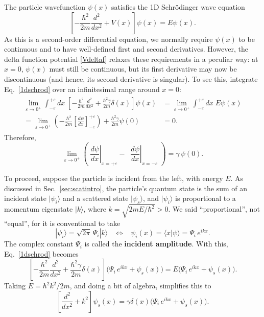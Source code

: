 \documentclass[pra,12pt]{revtex4-2}
\begin{document}
The particle wavefunction $\psi(x)$ satisfies the 1D Schr\"odinger
wave equation
\begin{equation}
  \left[-\frac{\hbar^2}{2m} \frac{d^2}{dx^2} + V(x) \right] \psi(x)
  = E \psi(x).
  \label{1dschrod}
\end{equation}
As this is a second-order differential equation, we normally require
$\psi(x)$ to be continuous and to have well-defined first and second
derivatives.  However, the delta function potential \eqref{Vdeltaf}
relaxes these requirements in a peculiar way: at $x=0$, $\psi(x)$ must
still be continuous, but its first derivative may now be discontinuous
(and hence, its second derivative is singular).  To see this,
integrate Eq.~\eqref{1dschrod} over an infinitesimal range around $x =
0$:
\begin{align}
  \begin{aligned}\lim_{\varepsilon\rightarrow 0^+} \int_{-\varepsilon}^{+\varepsilon} dx\; \left[-\frac{\hbar^2}{2m} \frac{d^2}{dx^2} + \frac{\hbar^2\gamma}{2m} \delta(x)\right] \psi(x) &= \lim_{\varepsilon\rightarrow 0^+} \int_{-\varepsilon}^{+\varepsilon} dx\; E \psi(x) \\ = \lim_{\varepsilon\rightarrow 0^+} \left(-\frac{\hbar^2}{2m} \left[\frac{d\psi}{dx}\right]_{-\varepsilon}^{+\varepsilon} \right) + \frac{\hbar^2\gamma}{2m} \psi(0) &= 0.
  \end{aligned}
\end{align}
Therefore,
\begin{equation}
  \lim_{\varepsilon\rightarrow 0^+} \left(\; \left.\frac{d\psi}{dx}\right|_{x = +\varepsilon} - \;\; \left.\frac{d\psi}{dx}\right|_{x = -\varepsilon}\; \right) =  \gamma \,\psi(0).
  \label{delta_discontinuity}
\end{equation}

To proceed, suppose the particle is incident from the left, with
energy $E$.  As discussed in Sec.~\ref{sec:scatintro}, the particle's
quantum state is the sum of an incident state $|\psi_i\rangle$ and a
scattered state $|\psi_s\rangle$, and $|\psi_i\rangle$ is
proportional to a momentum eigenstate $|k\rangle$, where $k =
\sqrt{2mE/\hbar^2} > 0$.  We said ``proportional'', not ``equal'', for
it is conventional to take
\begin{equation}
  |\psi_i\rangle = \sqrt{2\pi}\, \Psi_i |k\rangle \;\;\; \Leftrightarrow\;\;\; \psi_i(x) = \langle x|\psi\rangle = \Psi_i \, e^{ik x}.
  \label{psiin1d}
\end{equation}
The complex constant $\Psi_i$ is called the \textbf{incident
  amplitude}.  With this, Eq.~\eqref{1dschrod} becomes
\begin{equation}
  \left[-\frac{\hbar^2}{2m} \frac{d^2}{dx^2} + \frac{\hbar^2\gamma}{2m}\delta(x)\right] \Big(\Psi_i \, e^{ikx} + \psi_s(x) \Big)
  = E \Big(\Psi_i \, e^{ikx} + \psi_s(x) \Big).
\end{equation}
Taking $E = \hbar^2k^2/2m$, and doing a bit of algebra, simplifies this to
\begin{equation}
  \left[ \frac{d^2}{dx^2} + k^2\right] \psi_s(x)
  = \gamma \delta(x) \Big(\Psi_i \, e^{ikx} + \psi_s(x) \Big).
  \label{deltaschrod}
\end{equation}
\end{document}
